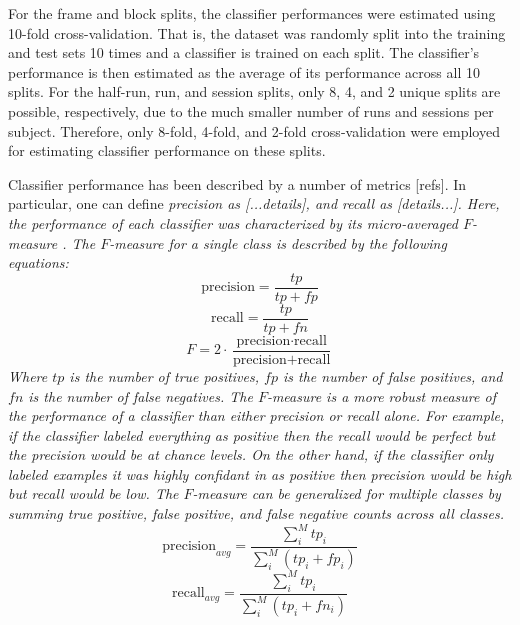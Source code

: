 \documentclass[final]{article}
\begin{document}
For the frame and block splits, the classifier performances were estimated using 10-fold cross-validation.
That is, the dataset was randomly split into the training and test sets 10 times and a classifier is trained on each split.
The classifier's performance is then estimated as the average of its performance across all 10 splits.
For the half-run, run, and session splits, only 8, 4, and 2 unique splits are possible, respectively, due to 
the much smaller number of runs and sessions per subject. Therefore, only 8-fold, 4-fold, and 2-fold 
cross-validation were employed for estimating classifier performance on these splits.

Classifier performance has been described by a number of metrics [refs]. In 
particular, one can define \it{precision} as [...details], and \it{recall} as 
[details...]. Here, the performance of each classifier was characterized by its micro-averaged
 $F$-measure \cite{Ozgur2005}. The $F$-measure for a single class is described by the following 
 equations:
\begin{equation}
\mbox{precision} = \frac{tp}{tp + fp}
\label{eqn:precision}
\end{equation}
\begin{equation}
\mbox{recall} = \frac{tp}{tp + fn}
\label{eqn:recall}
\end{equation}
\begin{equation}
F = 2 \cdot \frac{\mbox{precision} \cdot \mbox{recall}}{\mbox{precision} + \mbox{recall}}
\label{eqn:f1}
\end{equation}
Where $tp$ is the number of true positives, $fp$ is the number of false positives, and $fn$ is the number of false negatives.
The $F$-measure is a more robust measure of the performance of a classifier than either precision or recall alone.
For example, if the classifier labeled everything as positive then the recall would be perfect but the precision would be at chance levels.
On the other hand, if the classifier only labeled examples it was highly confidant in as positive then precision would be high but recall would be low.
The $F$-measure can be generalized for multiple classes by summing true positive, false positive, and false negative counts across all classes.
\begin{equation}
\mbox{precision}_{avg} =\frac{\sum_{i}^{M}{tp_{i}}}{\sum_{i}^{M}{\left( tp_{i} + fp_{i} \right)}}
\end{equation}
\begin{equation}
\mbox{recall}_{avg} = \frac{\sum_{i}^{M}{tp_{i}}}{\sum_{i}^{M}{\left( tp_{i} + fn_{i} \right)}}
\end{equation}
\end{document}
